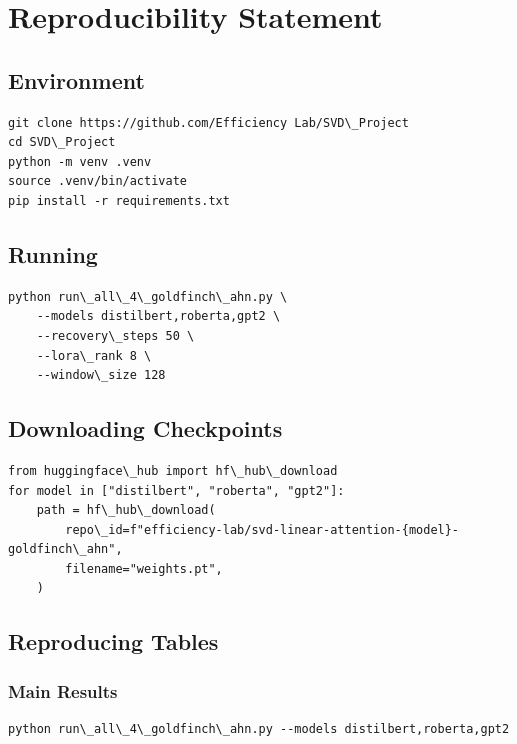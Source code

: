 
\section{Reproducibility Statement}

\subsection{Environment}

\begin{lstlisting}
git clone https://github.com/Efficiency Lab/SVD\_Project
cd SVD\_Project
python -m venv .venv
source .venv/bin/activate
pip install -r requirements.txt
\end{lstlisting}

\subsection{Running}

\begin{lstlisting}
python run\_all\_4\_goldfinch\_ahn.py \
    --models distilbert,roberta,gpt2 \
    --recovery\_steps 50 \
    --lora\_rank 8 \
    --window\_size 128
\end{lstlisting}

\subsection{Downloading Checkpoints}

\begin{lstlisting}
from huggingface\_hub import hf\_hub\_download
for model in ["distilbert", "roberta", "gpt2"]:
    path = hf\_hub\_download(
        repo\_id=f"efficiency-lab/svd-linear-attention-{model}-goldfinch\_ahn",
        filename="weights.pt",
    )
\end{lstlisting}

\subsection{Reproducing Tables}

\subsubsection{Main Results}

\begin{lstlisting}
python run\_all\_4\_goldfinch\_ahn.py --models distilbert,roberta,gpt2
\end{lstlisting}

